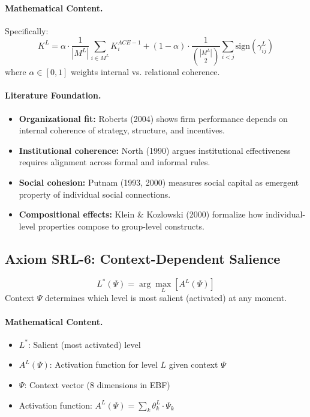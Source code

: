 \paragraph{Mathematical Content.}
Specifically:
\begin{equation}
K^L = \alpha \cdot \frac{1}{|M^L|} \sum_{i \in M^L} K^{ACE-1}_i + (1-\alpha) \cdot \frac{1}{\binom{|M^L|}{2}} \sum_{i < j} \text{sign}(\gamma^L_{ij})
\end{equation}
where $\alpha \in [0,1]$ weights internal vs. relational coherence.

\paragraph{Literature Foundation.}
\begin{itemize}
\item \textbf{Organizational fit:} Roberts (2004) shows firm performance depends 
on internal coherence of strategy, structure, and incentives.
\item \textbf{Institutional coherence:} North (1990) argues institutional 
effectiveness requires alignment across formal and informal rules.
\item \textbf{Social cohesion:} Putnam (1993, 2000) measures social capital 
as emergent property of individual social connections.
\item \textbf{Compositional effects:} Klein \& Kozlowski (2000) formalize how 
individual-level properties compose to group-level constructs.
\end{itemize}

\subsection{Axiom SRL-6: Context-Dependent Salience}

\begin{tcolorbox}[colback=gray!5!white, colframe=gray!75!black, title=Axiom SRL-6: Context Salience]
\begin{equation}
\boxed{
L^*(\Psi) = \arg\max_L \left[ A^L(\Psi) \right]
}
\end{equation}
Context $\Psi$ determines which level is most salient (activated) at any moment.
\end{tcolorbox}

\paragraph{Mathematical Content.}
\begin{itemize}
\item $L^*$: Salient (most activated) level
\item $A^L(\Psi)$: Activation function for level $L$ given context $\Psi$
\item $\Psi$: Context vector (8 dimensions in EBF)
\item Activation function: $A^L(\Psi) = \sum_k \theta^L_k \cdot \Psi_k$
\end{itemize}

